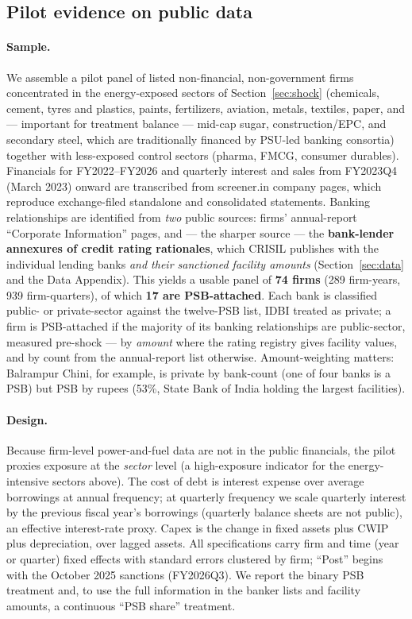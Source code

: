 \documentclass[12pt]{article}
\begin{document}
\subsection{Pilot evidence on public data}\label{sec:pilot}

\paragraph{Sample.} We assemble a pilot panel of listed non-financial, non-government firms
concentrated in the energy-exposed sectors of Section~\ref{sec:shock} (chemicals, cement,
tyres and plastics, paints, fertilizers, aviation, metals, textiles, paper, and ---
important for treatment balance --- mid-cap sugar, construction/EPC, and secondary steel,
which are traditionally financed by PSU-led banking consortia) together with less-exposed
control sectors (pharma, FMCG, consumer durables). Financials for FY2022--FY2026 and
quarterly interest and sales from FY2023Q4 (March 2023) onward are transcribed from
screener.in company pages, which reproduce exchange-filed standalone and consolidated
statements. Banking relationships are identified from \emph{two} public sources: firms'
annual-report ``Corporate Information'' pages, and --- the sharper source --- the
\textbf{bank-lender annexures of credit rating rationales}, which CRISIL publishes with the
individual lending banks \emph{and their sanctioned facility amounts} (Section~\ref{sec:data}
and the Data Appendix). This yields a usable panel of \textbf{74 firms} (289 firm-years, 939
firm-quarters), of which \textbf{17 are PSB-attached}. Each bank is classified public- or
private-sector against the twelve-PSB list, IDBI treated as private; a firm is PSB-attached
if the majority of its banking relationships are public-sector, measured pre-shock ---
by \emph{amount} where the rating registry gives facility values, and by count from the
annual-report list otherwise. Amount-weighting matters: Balrampur Chini, for example, is
private by bank-count (one of four banks is a PSB) but PSB by rupees (53\%, State Bank of
India holding the largest facilities).

\paragraph{Design.} Because firm-level power-and-fuel data are not in the public financials,
the pilot proxies exposure at the \emph{sector} level (a high-exposure indicator for the
energy-intensive sectors above). The cost of debt is interest expense over average
borrowings at annual frequency; at quarterly frequency we scale quarterly interest by the
previous fiscal year's borrowings (quarterly balance sheets are not public), an effective
interest-rate proxy. Capex is the change in fixed assets plus CWIP plus depreciation, over
lagged assets. All specifications carry firm and time (year or quarter) fixed effects with
standard errors clustered by firm; ``Post'' begins with the October 2025 sanctions
(FY2026Q3). We report the binary PSB treatment and, to use the full information in the
banker lists and facility amounts, a continuous ``PSB share'' treatment.
\end{document}
